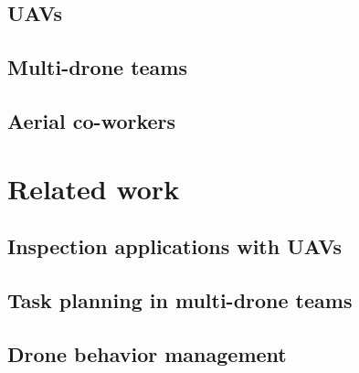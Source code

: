 
\subsection{UAVs}
\label{subsec:UAVs}

\subsection{Multi-drone teams}
\label{subsec:Multi-droneTeams}

\subsection{Aerial co-workers}
\label{subsec:AerialCo-workers}

\section{Related work}
\label{sec:RelatedWork}

\subsection{Inspection applications with UAVs}
\label{subsec:InspectionApplicationsWithUAVs}

\subsection{Task planning in multi-drone teams}
\label{subsec:TaskPlanning}

\subsection{Drone behavior management}
\label{subsec:DroneBehaviorManagement}


